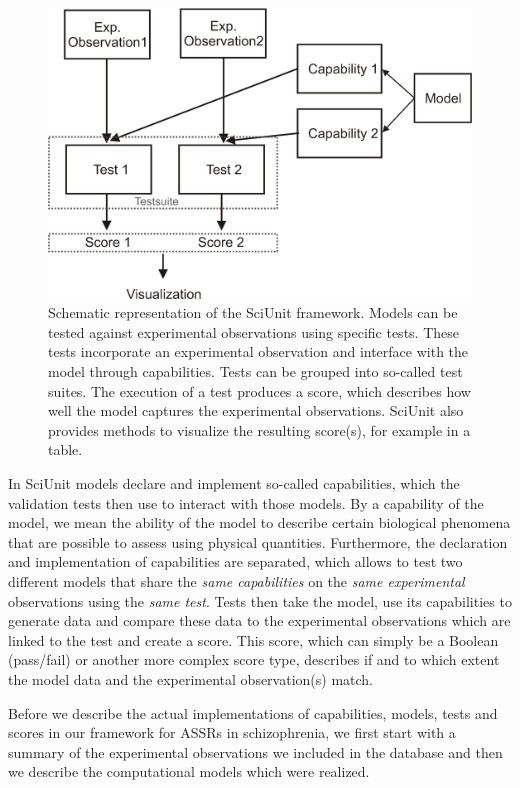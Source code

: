 \documentclass[CompPsych]{stjour}
\begin{document}
\begin{figure}
\includegraphics[width=\textwidth]{Figures/SciUnit-Overview-Schematic}
\caption{Schematic representation of the SciUnit framework. Models can be tested against experimental observations using specific tests. 
These tests incorporate an experimental observation and interface with the model through capabilities. Tests can be grouped into so-called test suites. The execution of a test 
produces a score, which describes how well the model captures the experimental observations. SciUnit also provides methods to visualize the resulting score(s), for example in a table.}
\label{Fig:SciUnit-Scheme}
\end{figure}

In SciUnit models declare and implement so-called capabilities, which the validation tests then use to 
interact with those models. By a capability of the model, we mean the ability of the model to describe certain biological phenomena that are possible to assess using physical quantities.
Furthermore, the declaration
and implementation of capabilities are separated, which allows to test two different models that share the 
\textit{same capabilities} on the \textit{same experimental} observations using
the \textit{same test}. Tests then take the model, use its capabilities to generate data and compare these data to the 
experimental observations which are linked to the test
and create a score. This score, which can simply be a Boolean (pass/fail) or another more complex score type, 
describes if and to which extent the model data and the experimental observation(s) match.

Before we describe the actual implementations of capabilities, models, tests and scores in our framework for 
ASSRs in schizophrenia,
we first start with a summary of the experimental observations we included in the database and 
then we describe the computational models which were realized.
\end{document}
